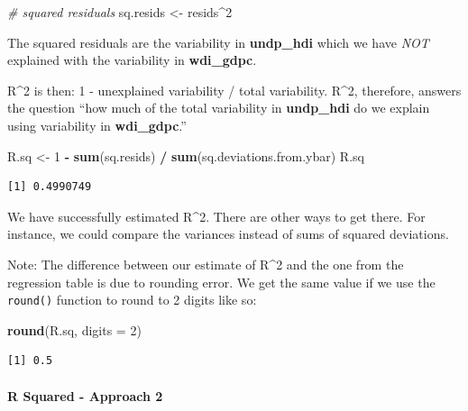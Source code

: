 \documentclass[]{article}
\newenvironment{Shaded}{\begin{snugshade}}{\end{snugshade}}
\newcommand{\KeywordTok}[1]{\textcolor[rgb]{0.13,0.29,0.53}{\textbf{#1}}}
\newcommand{\DataTypeTok}[1]{\textcolor[rgb]{0.13,0.29,0.53}{#1}}
\newcommand{\DecValTok}[1]{\textcolor[rgb]{0.00,0.00,0.81}{#1}}
\newcommand{\StringTok}[1]{\textcolor[rgb]{0.31,0.60,0.02}{#1}}
\newcommand{\CommentTok}[1]{\textcolor[rgb]{0.56,0.35,0.01}{\textit{#1}}}
\newcommand{\OperatorTok}[1]{\textcolor[rgb]{0.81,0.36,0.00}{\textbf{#1}}}
\newcommand{\NormalTok}[1]{#1}
\let\oldparagraph\paragraph
\renewcommand{\paragraph}[1]{\oldparagraph{#1}\mbox{}}
\theoremstyle{definition}
\theoremstyle{definition}
\theoremstyle{definition}
\theoremstyle{remark}
\begin{document}
\begin{Shaded}
\begin{Highlighting}[]
\CommentTok{# squared residuals}
\NormalTok{sq.resids <-}\StringTok{ }\NormalTok{resids}\OperatorTok{^}\DecValTok{2}
\end{Highlighting}
\end{Shaded}

The squared residuals are the variability in \textbf{undp\_hdi} which we
have \emph{NOT} explained with the variability in \textbf{wdi\_gdpc}.

R\^{}2 is then: 1 - unexplained variability / total variability. R\^{}2,
therefore, answers the question ``how much of the total variability in
\textbf{undp\_hdi} do we explain using variability in
\textbf{wdi\_gdpc}.''

\begin{Shaded}
\begin{Highlighting}[]
\NormalTok{R.sq <-}\StringTok{ }\DecValTok{1} \OperatorTok{-}\StringTok{ }\KeywordTok{sum}\NormalTok{(sq.resids) }\OperatorTok{/}\StringTok{ }\KeywordTok{sum}\NormalTok{(sq.deviations.from.ybar)}
\NormalTok{R.sq}
\end{Highlighting}
\end{Shaded}

\begin{verbatim}
[1] 0.4990749
\end{verbatim}

We have successfully estimated R\^{}2. There are other ways to get
there. For instance, we could compare the variances instead of sums of
squared deviations.

Note: The difference between our estimate of R\^{}2 and the one from the
regression table is due to rounding error. We get the same value if we
use the \texttt{round()} function to round to 2 digits like so:

\begin{Shaded}
\begin{Highlighting}[]
\KeywordTok{round}\NormalTok{(R.sq, }\DataTypeTok{digits =} \DecValTok{2}\NormalTok{)}
\end{Highlighting}
\end{Shaded}

\begin{verbatim}
[1] 0.5
\end{verbatim}

\paragraph{R Squared - Approach 2}\label{r-squared---approach-2}
\end{document}
